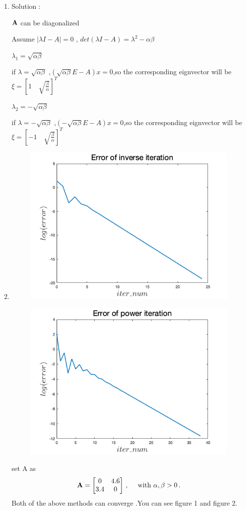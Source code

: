 \documentclass[english,onecolumn]{IEEEtran}
\newcommand{\bA}{{\bf A}}
\begin{document}
\begin{enumerate}
    \item 
        Solution :
    
    $\bA$ can be diagonalized
    
    Assume $|\lambda I - A| = 0$ , $det(\lambda I - A)=\lambda^2-\alpha \beta$
    
    $\lambda_1 =\sqrt{\alpha \beta} $
    
    if $\lambda =\sqrt{\alpha \beta} $ ,$(\sqrt{\alpha \beta} E-A)x = 0$,so the corresponding eignvector will be $\xi= [1    \quad \sqrt{\frac{\beta}{\alpha}}]^T$
    
    $\lambda_2 =-\sqrt{\alpha \beta} $
    
    if $\lambda =-\sqrt{\alpha \beta} $ ,$(-\sqrt{\alpha \beta} E-A)x = 0$,so the corresponding eignvector will be $\xi= [-1    \quad \sqrt{\frac{\beta}{\alpha}}]^T$
    
    \item
    \begin{figure}
    	\centering
    	\includegraphics[width=0.5\linewidth]{code/inv_iter}
    	\caption{}
    	\label{fig:inviter}
    \end{figure}
    \begin{figure}
    	\centering
    	\includegraphics[width=0.5\linewidth]{code/power_iter}
    	\caption{}
    	\label{fig:poweriter}
    \end{figure}
set A as \[
\bA = \begin{bmatrix}
	0 & 4.6 \\
	3.4 & 0
\end{bmatrix}\,,\quad \text{ with }\alpha,\beta > 0\,.
\]
Both of the above methods can converge .You can see figure 1 and figure 2.


\end{enumerate}
\end{document}
